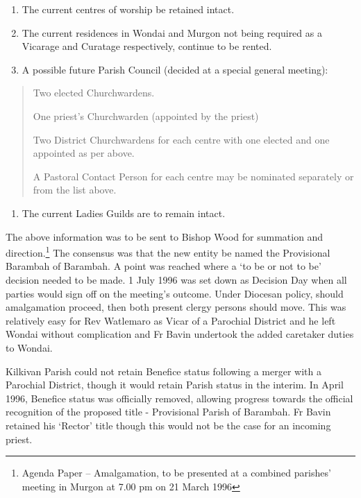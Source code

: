 \begin{enumerate}
\def\labelenumi{\arabic{enumi}.}
\setcounter{enumi}{2}
\item
  The current centres of worship be retained intact.
\item
  The current residences in Wondai and Murgon not being required as a Vicarage and Curatage respectively, continue to be rented.
\item
  A possible future Parish Council (decided at a special general meeting):
\end{enumerate}

\begin{quote}
Two elected Churchwardens.

One priest's Churchwarden (appointed by the priest)

Two District Churchwardens for each centre with one elected and one appointed as per above.

A Pastoral Contact Person for each centre may be nominated separately or from the list above.
\end{quote}

\begin{enumerate}
\def\labelenumi{\arabic{enumi}.}
\setcounter{enumi}{5}
\item
  The current Ladies Guilds are to remain intact.
\end{enumerate}

The above information was to be sent to Bishop Wood for summation and direction.\footnote{Agenda Paper -- Amalgamation, to be presented at a combined parishes' meeting in Murgon at 7.00 pm on 21 March 1996} The consensus was that the new entity be named the Provisional Barambah of Barambah. A point was reached where a `to be or not to be' decision needed to be made. 1 July 1996 was set down as Decision Day when all parties would sign off on the meeting's outcome. Under Diocesan policy, should amalgamation proceed, then both present clergy persons should move. This was relatively easy for Rev Watlemaro as Vicar of a Parochial District and he left Wondai without complication and Fr Bavin undertook the added caretaker duties to Wondai.

Kilkivan Parish could not retain Benefice status following a merger with a Parochial District, though it would retain Parish status in the interim. In April 1996, Benefice status was officially removed, allowing progress towards the official recognition of the proposed title - Provisional Parish of Barambah. Fr Bavin retained his `Rector' title though this would not be the case for an incoming priest.

